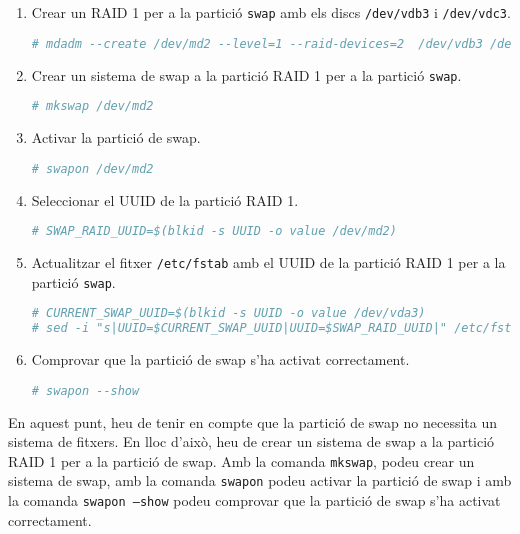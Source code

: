 \begin{enumerate}
        \item Crear un RAID 1 per a la partició \texttt{swap} amb els discs \texttt{/dev/vdb3} i \texttt{/dev/vdc3}.
\begin{lstlisting}[language=bash, numbers=none, commentstyle=\color{black}]
# mdadm --create /dev/md2 --level=1 --raid-devices=2  /dev/vdb3 /dev/vdc3
\end{lstlisting}
        \item Crear un sistema de swap a la partició RAID 1 per a la partició \texttt{swap}.
\begin{lstlisting}[language=bash, numbers=none, commentstyle=\color{black}]
# mkswap /dev/md2
\end{lstlisting}
        \item Activar la partició de swap.
\begin{lstlisting}[language=bash, numbers=none, commentstyle=\color{black}]
# swapon /dev/md2
\end{lstlisting}
        \item Seleccionar el UUID de la partició RAID 1.
\begin{lstlisting}[language=bash, numbers=none, commentstyle=\color{black}]
# SWAP_RAID_UUID=$(blkid -s UUID -o value /dev/md2)
\end{lstlisting}
        \item Actualitzar el fitxer \texttt{/etc/fstab} amb el UUID de la partició RAID 1 per a la partició \texttt{swap}.
\begin{lstlisting}[language=bash, numbers=none, commentstyle=\color{black}]
# CURRENT_SWAP_UUID=$(blkid -s UUID -o value /dev/vda3)
# sed -i "s|UUID=$CURRENT_SWAP_UUID|UUID=$SWAP_RAID_UUID|" /etc/fstab
\end{lstlisting}
        \item Comprovar que la partició de swap s'ha activat correctament.
\begin{lstlisting}[language=bash, numbers=none, commentstyle=\color{black}]
# swapon --show
\end{lstlisting}
\end{enumerate}

\begin{info}
En aquest punt, heu de tenir en compte que la partició de swap no necessita un sistema de fitxers. En lloc d'això, heu de crear un sistema de swap a la partició RAID 1 per a la partició de swap. Amb la comanda \texttt{mkswap}, podeu crear un sistema de swap, amb la comanda \texttt{swapon} podeu activar la partició de swap i amb la comanda \texttt{swapon --show} podeu comprovar que la partició de swap s'ha activat correctament.
\end{info}

